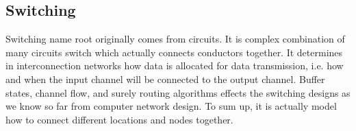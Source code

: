 \subsection{Switching}
Switching name root originally comes from circuits. It is complex combination of many circuits switch which actually connects conductors together. It determines in interconnection networks how data is allocated for data transmission, i.e. how and when the input channel will be connected to the output channel. Buffer states, channel flow, and surely routing algorithms effects the switching designs as we know so far from computer network design. To sum up, it is actually model how to connect different locations and nodes together\cite{ComputerArchCoursera}.
